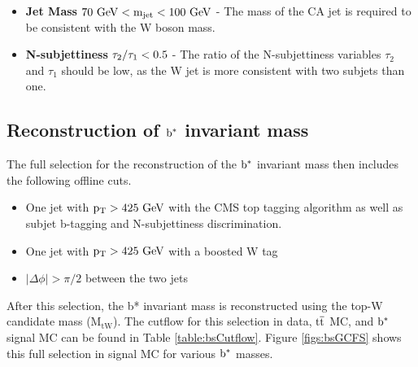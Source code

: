 \begin{itemize}
\item {\bf Jet Mass}  $\mathrm{\boldmath 70~\mathrm{GeV} < m_{\text{jet}} < 100~\mathrm{GeV}}$ - The mass of the CA jet is required to be consistent with the W boson mass. 
\item {\bf N-subjettiness} $\mathrm{\boldmath \tau_{2}/\tau_{1} < 0.5}$  - The ratio of the N-subjettiness variables $\tau_{2}$ and $\tau_{1}$ should be low, as the W jet is more consistent with two subjets than one.
\end{itemize}

\subsection{Reconstruction of $\mathrm{b}^{*}$ invariant mass}
\label{sec:bsfullselection}
The full selection for the reconstruction of the $\mathrm{b}^{*}$ invariant mass then includes the following offline cuts.
\begin{itemize}
\item One jet with $\mathrm{p_{T}} > 425~\mathrm{GeV}$ with the CMS top tagging algorithm as well as subjet b-tagging and N-subjettiness discrimination.
\item One jet with $\mathrm{p_{T}} > 425~\mathrm{GeV}$ with a boosted W tag
\item $|\Delta \phi| > \pi/2$ between the two jets
\end{itemize}
After this selection, the b* invariant mass is reconstructed using the top-W candidate mass ($\mathrm{M_{tW}}$).
The cutflow for this selection in data, $\mathrm{t\overline{t}}$ MC, and $\mathrm{b}^{*}$ signal MC can be found in Table \ref{table:bsCutflow}.
Figure \ref{figs:bsGCFS} shows this full selection in signal MC for various $\mathrm{b}^{*}$ masses.  



